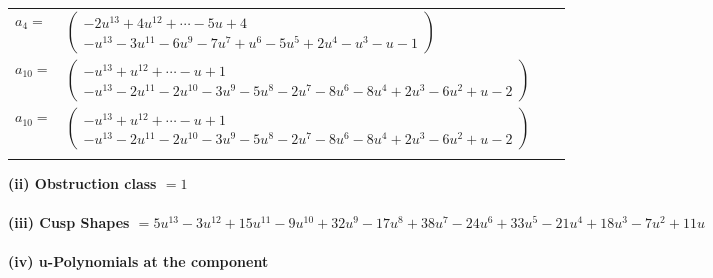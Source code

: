 \documentclass[1p]{elsarticle_modified}
\theoremstyle{definition}
\begin{document}
\begin{tabular}{m{7pt} m{180pt} m{7pt} m{180pt} }
\flushright $a_{4}=$&$\begin{pmatrix}-2 u^{13}+4 u^{12}+\cdots-5 u+4\\- u^{13}-3 u^{11}-6 u^9-7 u^7+u^6-5 u^5+2 u^4- u^3- u-1\end{pmatrix}$ \\
\flushright $a_{10}=$&$\begin{pmatrix}- u^{13}+u^{12}+\cdots- u+1\\- u^{13}-2 u^{11}-2 u^{10}-3 u^9-5 u^8-2 u^7-8 u^6-8 u^4+2 u^3-6 u^2+u-2\end{pmatrix}$\\ \flushright $a_{10}=$&$\begin{pmatrix}- u^{13}+u^{12}+\cdots- u+1\\- u^{13}-2 u^{11}-2 u^{10}-3 u^9-5 u^8-2 u^7-8 u^6-8 u^4+2 u^3-6 u^2+u-2\end{pmatrix}$\\&\end{tabular}
\flushleft \textbf{(ii) Obstruction class $= 1$}\\~\\
\flushleft \textbf{(iii) Cusp Shapes $= 5 u^{13}-3 u^{12}+15 u^{11}-9 u^{10}+32 u^9-17 u^8+38 u^7-24 u^6+33 u^5-21 u^4+18 u^3-7 u^2+11 u$}\\~\\
\newpage\renewcommand{\arraystretch}{1}
\flushleft \textbf{(iv) u-Polynomials at the component}\newline \\
\end{document}

